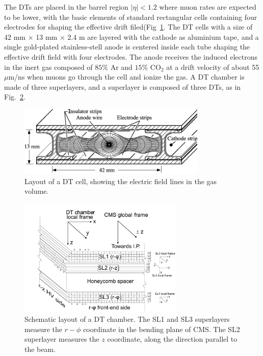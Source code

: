 The DTs are placed in the barrel region $|\eta| < 1.2$ where muon rates are expected to be lower, with the basic elements of standard rectangular cells containing four electrodes for shaping the effective drift filed(Fig~\ref{fig:cms_cell}.
The DT cells with a size of 42 mm $\times$ 13 mm $\times$ 2.4 m are layered with the cathode as aluminium tape, and a single gold-plated stainless-stell anode is centered inside each tube shaping the effective drift field with four electrodes.
The anode receives the induced electrons in the inert gas composed of $85\%$ Ar and $15\%$ $\mathrm{CO_2}$ at a drift velocity of about 55$\mu$m/ns when muons go through the cell and ionize the gas.
A DT chamber is made of three superlayers, and a superlayer is composed of three DTs, as in Fig.~\ref{fig:cms_DT}.
\begin{figure}\centering
    \includegraphics[width=0.8\textwidth]{figure/cms_cell.png}
    \caption[Layout of a DT cell.]
    {Layout of a DT cell, showing the electric field lines in the gas volume.}
    \label{fig:cms_cell}
\end{figure}

\begin{figure}\centering
    \includegraphics[width=0.7\textwidth]{figure/cms_DT.png}
    \caption[Schematic layout of a DT chamber.]
    {
        Schematic layout of a DT chamber. 
        The SL1 and SL3 superlayers measure the $r-\phi$ coordinate in the bending plane of CMS.
        The SL2 superlayer measures the $z$ coordinate, along the direction parallel to the beam.
    }
    \label{fig:cms_DT}
\end{figure}

